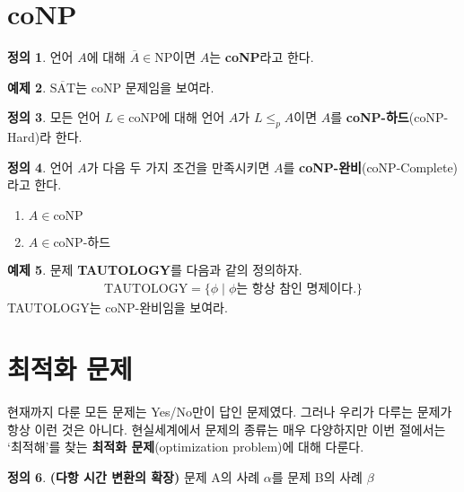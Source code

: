 \documentclass[b5paper, 10pt]{book}
\theoremstyle{definition}
\newtheorem{defn}{정의}[chapter]
\newtheorem{ex}[defn]{예제}
\begin{document}
\section{coNP}
\begin{defn}
    언어 $A$에 대해 $\overline{A} \in \text{NP}$이면 $A$는 \textbf{coNP}라고 한다.   
\end{defn}
\begin{ex}
    $\overline{\text{SAT}}$는 coNP 문제임을 보여라.
\end{ex}
\begin{defn}
    모든 언어 $L \in \text{coNP}$에 대해 언어 $A$가 $L \le_p A$이면 $A$를 
    \textbf{coNP-하드}(coNP-Hard)라 한다.
\end{defn}
\begin{defn}
    언어 $A$가 다음 두 가지 조건을 만족시키면 $A$를 \textbf{coNP-완비}(coNP-Complete)라고 한다.
    \begin{enumerate}
        \item $A \in \text{coNP}$
        \item $A \in \text{coNP-하드}$
    \end{enumerate}
\end{defn}
\begin{ex}
    문제 \textbf{TAUTOLOGY}를 다음과 같의 정의하자. 
    \begin{align*}
        \text{TAUTOLOGY} = \{ \phi \;\vert\; \phi \text{는 항상 참인 명제이다.}\}
    \end{align*}
    TAUTOLOGY는 coNP-완비임을 보여라.
\end{ex}
\section{최적화 문제}
현재까지 다룬 모든 문제는 Yes/No만이 답인 문제였다. 그러나 우리가 다루는 문제가 항상 이런 것은 아니다. 
현실세계에서 문제의 종류는 매우 다양하지만 
이번 절에서는 `최적해'를 찾는 \textbf{최적화 문제}(optimization problem)에 대해 다룬다.
\begin{defn}
    \textbf{(다항 시간 변환의 확장)} 문제 A의 사례 $\alpha$를 문제 B의 사례 $\beta$
\end{defn} 
\end{document}
